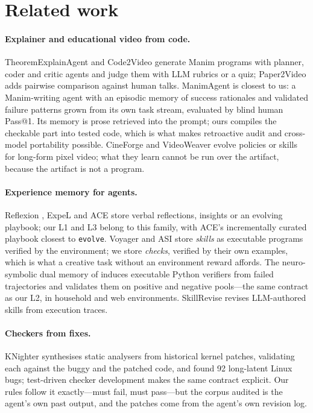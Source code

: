 \documentclass[11pt]{article}
\begin{document}
\section{Related work}

\paragraph{Explainer and educational video from code.} TheoremExplainAgent \citep{theoremexplain2025}
and Code2Video \citep{code2video2026} generate Manim programs with planner, coder and critic agents
and judge them with LLM rubrics or a quiz; Paper2Video \citep{paper2video2025} adds pairwise
comparison against human talks. ManimAgent \citep{manimagent2026} is closest to us: a Manim-writing
agent with an episodic memory of success rationales and validated failure patterns grown from its own
task stream, evaluated by blind human Pass@1. Its memory is prose retrieved into the prompt; ours
compiles the checkable part into tested code, which is what makes retroactive audit and cross-model
portability possible. CineForge \citep{cineforge2026} and VideoWeaver \citep{videoweaver2026} evolve
policies or skills for long-form pixel video; what they learn cannot be run over the artifact,
because the artifact is not a program.

\paragraph{Experience memory for agents.} Reflexion \citep{reflexion2023}, ExpeL \citep{expel2024}
and ACE \citep{ace2026} store verbal reflections, insights or an evolving playbook; our L1 and L3
belong to this family, with ACE's incrementally curated playbook closest to \texttt{evolve}. Voyager
\citep{voyager2023} and ASI \citep{asi2025} store \emph{skills} as executable programs verified by the
environment; we store \emph{checks}, verified by their own examples, which is what a creative task
without an environment reward affords. The neuro-symbolic dual memory of \citet{neurosymbolicmem2026}
induces executable Python verifiers from failed trajectories and validates them on positive and
negative pools---the same contract as our L2, in household and web environments. SkillRevise
\citep{skillrevise2026} revises LLM-authored skills from execution traces.

\paragraph{Checkers from fixes.} KNighter \citep{knighter2025} synthesises static analysers from
historical kernel patches, validating each against the buggy and the patched code, and found 92
long-latent Linux bugs; test-driven checker development \citep{codechecker2024} makes the same
contract explicit. Our rules follow it exactly---must fail, must pass---but the corpus audited is the
agent's own past output, and the patches come from the agent's own revision log.
\end{document}
